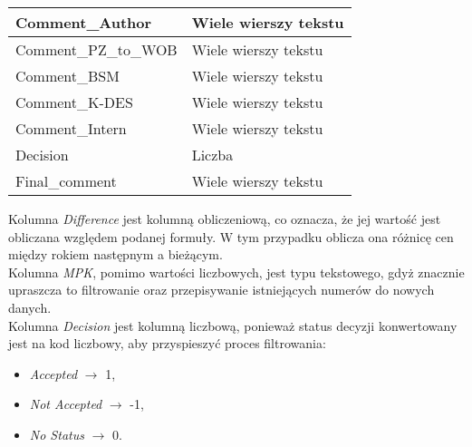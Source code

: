 \begin{table}[h]
\begin{tabular}{|l|l|}
        Comment\_Author            & Wiele wierszy tekstu     \\ \hline
        Comment\_PZ\_to\_WOB       & Wiele wierszy tekstu     \\ \hline
        Comment\_BSM               & Wiele wierszy tekstu     \\ \hline
        Comment\_K-DES             & Wiele wierszy tekstu     \\ \hline
        Comment\_Intern            & Wiele wierszy tekstu     \\ \hline
        Decision                   & Liczba                   \\ \hline
        Final\_comment             & Wiele wierszy tekstu     \\ \hline
    \end{tabular}
\end{table}

\noindent Kolumna \emph{Difference} jest kolumną obliczeniową, co oznacza, że jej wartość jest obliczana względem podanej formuły. W tym przypadku oblicza ona różnicę cen między rokiem następnym a bieżącym. \\
Kolumna \emph{MPK}, pomimo wartości liczbowych, jest typu tekstowego, gdyż znacznie upraszcza to filtrowanie oraz przepisywanie istniejących numerów do nowych danych. \\
Kolumna \emph{Decision} jest kolumną liczbową, ponieważ status decyzji konwertowany jest na kod liczbowy, aby przyspieszyć proces filtrowania:
\begin{itemize}
    \item \emph{Accepted} $\rightarrow$ 1,
    \item \emph{Not Accepted} $\rightarrow$ -1,
    \item \emph{No Status} $\rightarrow$ 0.
\end{itemize}



